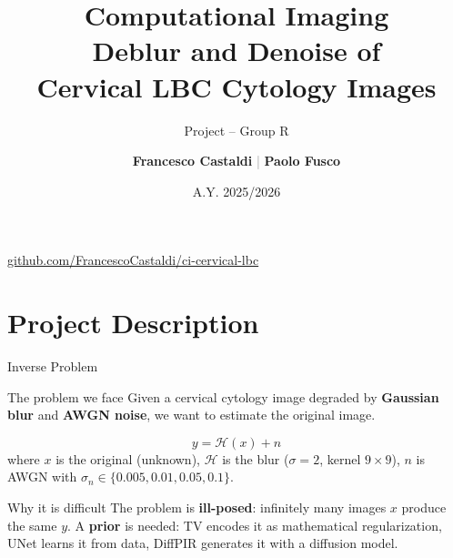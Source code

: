 \documentclass[english,10pt]{beamer}
\title[CI -- Deblur \& Denoise LBC]{\textbf{Computational Imaging}\\Deblur and Denoise of\\Cervical LBC Cytology Images}
\subtitle{Project -- Group R}
\author[Castaldi, Fusco]{\textbf{Francesco Castaldi}\; \textcolor{gray}{|}\; \textbf{Paolo Fusco}}
\institute[DISI -- UniBO]{Department of Computer Science -- Science and Engineering\\University of Bologna}
\date{A.Y. 2025/2026}
\begin{document}
\begin{frame}[plain]
  \titlepage
  \vspace{-0.5cm}
  \begin{center}
    \small\href{https://github.com/FrancescoCastaldi/ci-cervical-lbc}{github.com/FrancescoCastaldi/ci-cervical-lbc}
  \end{center}
\end{frame}

\section{Project Description}

\begin{frame}{Inverse Problem}
  \begin{block}{The problem we face}
    Given a cervical cytology image degraded by \textbf{Gaussian blur} and \textbf{AWGN noise}, we want to estimate the original image.
  \end{block}
  \begin{equation*}
    y = \mathcal{H}(x) + n
  \end{equation*}
  \noindent where $x$ is the original (unknown), $\mathcal{H}$ is the blur ($\sigma=2$, kernel $9\times9$), $n$ is AWGN with $\sigma_n \in \{0.005, 0.01, 0.05, 0.1\}$.
  \vspace{0.15cm}
  \begin{alertblock}{Why it is difficult}
    The problem is \textbf{ill-posed}: infinitely many images $x$ produce the same $y$. A \textbf{prior} is needed: TV encodes it as mathematical regularization, UNet learns it from data, DiffPIR generates it with a diffusion model.
  \end{alertblock}
\end{frame}
\end{document}
